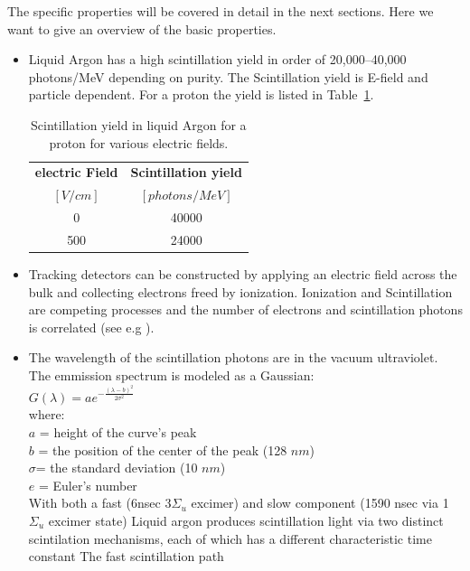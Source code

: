 \documentclass{article}
\begin{document}
The specific properties will be covered in detail in the next sections. Here we want to give an overview of the basic properties.
  \begin{itemize}
\item 
Liquid Argon has a high scintillation yield in order of 20,000–40,000 photons/MeV depending on purity. The Scintillation yield is E-field and particle dependent.
For a proton the yield is listed in Table~\ref{tab:tablezero}.
  \begin{table}[h!]
  \begin{center}
    \label{tab:tablezero}
    \begin{tabular}{|c|c|} 
      \hline
      \textbf{electric Field}& \textbf{Scintillation yield}\\
              $[V/cm]$ & $[photons/MeV]$ \\
      \hline
      0&40000\\
      500&24000\\
      \hline
    \end{tabular}
  \end{center}
  \caption{Scintillation yield in liquid Argon for a proton for various electric fields.}
  \end{table}
  
\item Tracking detectors can be constructed by applying an electric field across the bulk
  and collecting electrons freed by ionization. Ionization and Scintillation are competing
  processes and the number of electrons and scintillation photons is correlated (see e.g \cite{ref:nest}). 

\item The wavelength of the scintillation photons are in the vacuum ultraviolet. The emmission spectrum is modeled as a Gaussian:\\
  $G(\lambda)= ae ^ {- \frac {(\lambda-b)^2} {2\sigma^2}}$ \\
  where: \\
$a$	= 	height of the curve's peak\\
$b$	= 	the position of the center of the peak (128 $nm$)\\
$\sigma$= 	the standard deviation (10 $nm$)\\
$e$	= 	Euler's number\\

With both a fast (6nsec 3$\Sigma_u$ excimer) and slow component (1590 nsec via 1$\Sigma_u$ excimer state) 
Liquid argon produces scintillation light via two distinct scintilation mechanisms, each
of which has a different characteristic time constant
The fast scintillation path


\end{itemize}
\end{document}
